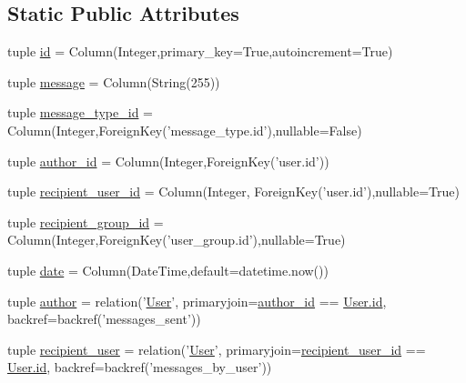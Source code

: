\subsection*{\-Static \-Public \-Attributes}
\begin{DoxyCompactItemize}
\item 
tuple \hyperlink{classcyberweb_1_1model_1_1message_1_1_message_a3e5d1ebf3c88557f6e2ed08a84c21d1f}{id} = \-Column(\-Integer,primary\-\_\-key=\-True,autoincrement=\-True)
\item 
tuple \hyperlink{classcyberweb_1_1model_1_1message_1_1_message_a58153115db46046a99f6891ea288eb3a}{message} = \-Column(\-String(255))
\item 
tuple \hyperlink{classcyberweb_1_1model_1_1message_1_1_message_a8a9bb47453ab0b2de8aa72c459433bb5}{message\-\_\-type\-\_\-id} = \-Column(\-Integer,\-Foreign\-Key('message\-\_\-type.\-id'),nullable=\-False)
\item 
tuple \hyperlink{classcyberweb_1_1model_1_1message_1_1_message_a3ce22320c52269a795d26a858a67adc9}{author\-\_\-id} = \-Column(\-Integer,\-Foreign\-Key('user.\-id'))
\item 
tuple \hyperlink{classcyberweb_1_1model_1_1message_1_1_message_aae5b48fb8f01c3b2e653f935ed98f049}{recipient\-\_\-user\-\_\-id} = \-Column(\-Integer, \-Foreign\-Key('user.\-id'),nullable=\-True)
\item 
tuple \hyperlink{classcyberweb_1_1model_1_1message_1_1_message_aa8fc84662c6fa13d3420d8e60896a3ba}{recipient\-\_\-group\-\_\-id} = \-Column(\-Integer,\-Foreign\-Key('user\-\_\-group.\-id'),nullable=\-True)
\item 
tuple \hyperlink{classcyberweb_1_1model_1_1message_1_1_message_a2c7864939966d614b08fde4f0c23e84e}{date} = \-Column(\-Date\-Time,default=datetime.\-now())
\item 
tuple \hyperlink{classcyberweb_1_1model_1_1message_1_1_message_ac1dc675540f98358d193d3e05125e3f0}{author} = relation('\hyperlink{classcyberweb_1_1model_1_1user_1_1_user}{\-User}', primaryjoin=\hyperlink{classcyberweb_1_1model_1_1message_1_1_message_a3ce22320c52269a795d26a858a67adc9}{author\-\_\-id} == \hyperlink{classcyberweb_1_1model_1_1user_1_1_user_ab204ad563a4069d43a98083399508934}{\-User.\-id}, backref=backref('messages\-\_\-sent'))
\item 
tuple \hyperlink{classcyberweb_1_1model_1_1message_1_1_message_a354a0195a1799c1be9a5dc5600c49789}{recipient\-\_\-user} = relation('\hyperlink{classcyberweb_1_1model_1_1user_1_1_user}{\-User}', primaryjoin=\hyperlink{classcyberweb_1_1model_1_1message_1_1_message_aae5b48fb8f01c3b2e653f935ed98f049}{recipient\-\_\-user\-\_\-id} == \hyperlink{classcyberweb_1_1model_1_1user_1_1_user_ab204ad563a4069d43a98083399508934}{\-User.\-id}, backref=backref('messages\-\_\-by\-\_\-user'))

\end{DoxyCompactItemize}
